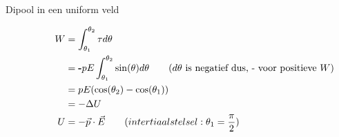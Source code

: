 \begin{app}{Dipool in een uniform veld}
    \begin{minipage}{.5\textwidth}
            \begin{align*}
                \hspace{1.1cm}
                W &= \int_{\theta_1}^{\theta_2} \tau d\theta \\ 
                  &= \textbf{-}pE\int_{\theta_1}^{\theta_2} \sin(\theta) d\theta \quad \quad (\text{$d\theta$ is negatief dus, - voor positieve $W$}) \\
                  &= pE(\cos(\theta_{2})-\cos(\theta_{1})) \\
                  &= -\Delta U \\ 
                U &= -\Vec{p} \cdot \Vec{E} \quad \quad (intertiaalstelsel: \theta_1 = \dfrac{\pi}{2}) \\\\
           \end{align*}
    \end{minipage} 
    \begin{minipage}{.5\textwidth}
    \end{minipage}
    \vspace{-1cm}
\end{app}